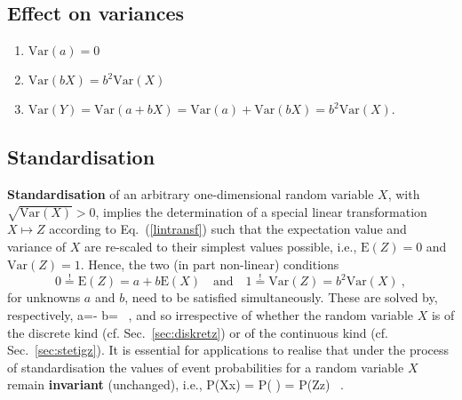 \subsection[Effect on variances]{Effect on variances}
%
\begin{enumerate}
\item $\mathrm{Var}(a) = 0$
\item $\mathrm{Var}(bX) = b^{2}\mathrm{Var}(X)$
\item $\mathrm{Var}(Y) = \mathrm{Var}(a+bX) = \mathrm{Var}(a)
+ \mathrm{Var}(bX) = b^{2}\mathrm{Var}(X)$.
\end{enumerate}
%

\subsection[Standardisation]{Standardisation}
\textbf{Standardisation} of an arbitrary one-dimensional random 
variable $X$, with $\sqrt{\mathrm{Var}(X)} > 0$, implies the 
determination of a special linear transformation $X \mapsto Z$ 
according to Eq.~(\ref{lintransf}) such that the expectation value 
and variance of $X$ are re-scaled to their simplest values 
possible, i.e., $\mathrm{E}(Z)=0$ and $\mathrm{Var}(Z)=1$. Hence,
the two (in part non-linear) conditions
%
\[
0 \stackrel{!}{=} \mathrm{E}(Z)= a+b\mathrm{E}(X)
\quad\text{and}\quad
1 \stackrel{!}{=} \mathrm{Var}(Z)= b^{2}\mathrm{Var}(X) \ ,
\]
%
for unknowns $a$ and $b$, need to be satisfied simultaneously. 
These are solved by, respectively,
%
\be
a=-
\quad{}\quad
b= \ ,
\ee
%
and so
%
\be
{}
\ee
%
irrespective of whether the random variable $X$ is of the discrete 
kind (cf. Sec.~\ref{sec:diskretz}) or of the continuous kind (cf. 
Sec.~\ref{sec:stetigz}). It is essential for applications to 
realise that under the process of standardisation 
the values of event probabilities for a random variable $X$ 
remain \textbf{invariant} (unchanged), i.e.,
%
\be
P(X\leq x)
= P\left(
\leq {}\right) = P(Z\leq z) \ .
\ee
%

